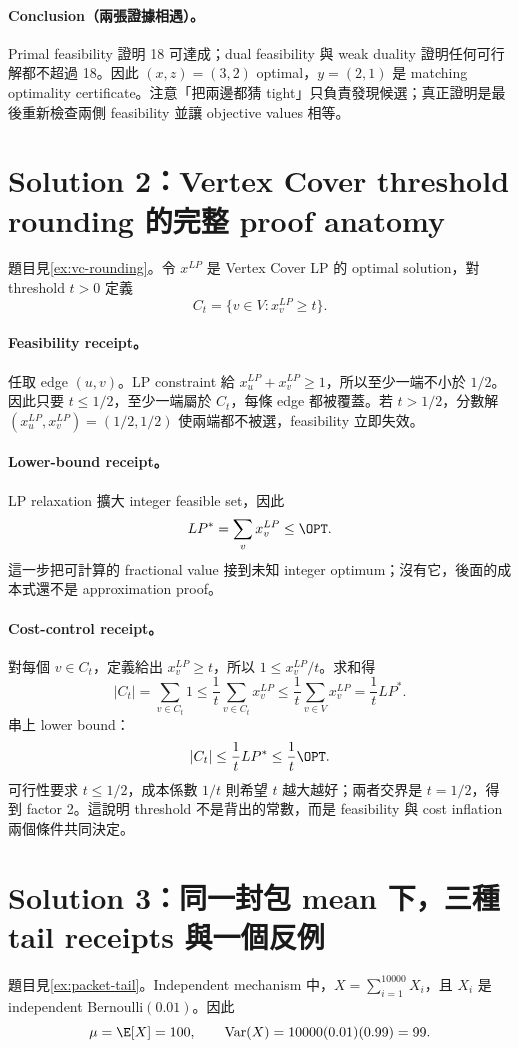 \documentclass[11pt,a4paper,oneside,openany]{book}
\begin{document}
\paragraph{Conclusion（兩張證據相遇）。}
Primal feasibility 證明 18 可達成；dual feasibility 與 weak duality 證明任何可行解都不超過 18。因此 $(x,z)=(3,2)$ optimal，$y=(2,1)$ 是 matching optimality certificate。注意「把兩邊都猜 tight」只負責發現候選；真正證明是最後重新檢查兩側 feasibility 並讓 objective values 相等。

\section*{Solution 2：Vertex Cover threshold rounding 的完整 proof anatomy}
題目見\cref{ex:vc-rounding}。令 $x^{LP}$ 是 Vertex Cover LP 的 optimal solution，對 threshold $t>0$ 定義
\[
 C_t=\{v\in V:x_v^{LP}\ge t\}.
\]

\paragraph{Feasibility receipt。}
任取 edge $(u,v)$。LP constraint 給 $x_u^{LP}+x_v^{LP}\ge1$，所以至少一端不小於 $1/2$。因此只要 $t\le1/2$，至少一端屬於 $C_t$，每條 edge 都被覆蓋。若 $t>1/2$，分數解 $(x_u^{LP},x_v^{LP})=(1/2,1/2)$ 使兩端都不被選，feasibility 立即失效。

\paragraph{Lower-bound receipt。}
LP relaxation 擴大 integer feasible set，因此
\[
 LP^*=\sum_vx_v^{LP}\le\OPT.
\]
這一步把可計算的 fractional value 接到未知 integer optimum；沒有它，後面的成本式還不是 approximation proof。

\paragraph{Cost-control receipt。}
對每個 $v\in C_t$，定義給出 $x_v^{LP}\ge t$，所以 $1\le x_v^{LP}/t$。求和得
\[
 |C_t|=\sum_{v\in C_t}1
 \le\frac1t\sum_{v\in C_t}x_v^{LP}
 \le\frac1t\sum_{v\in V}x_v^{LP}
 =\frac1t LP^*.
\]
串上 lower bound：
\[
 |C_t|\le\frac1t LP^*\le\frac1t\OPT.
\]
可行性要求 $t\le1/2$，成本係數 $1/t$ 則希望 $t$ 越大越好；兩者交界是 $t=1/2$，得到 factor 2。這說明 threshold 不是背出的常數，而是 feasibility 與 cost inflation 兩個條件共同決定。

\section*{Solution 3：同一封包 mean 下，三種 tail receipts 與一個反例}
題目見\cref{ex:packet-tail}。Independent mechanism 中，$X=\sum_{i=1}^{10000}X_i$，且 $X_i$ 是 independent Bernoulli$(0.01)$。因此
\[
 \mu=\E[X]=100,
 \qquad
 \operatorname{Var}(X)=10000(0.01)(0.99)=99.
\]
\end{document}
